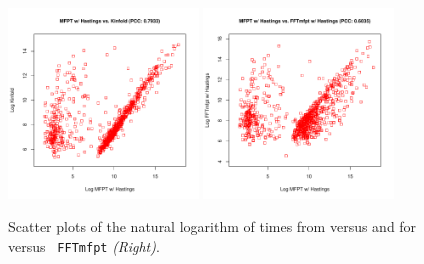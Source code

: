 \begin{figure}[!ht]
\centering
\includegraphics[width=0.45\textwidth]{Figures/Hermes/rnaMfptHastingsKinfold.pdf}
\quad
\includegraphics[width=0.45\textwidth]{Figures/Hermes/rnaMfptHastingsFftMfptHastings.pdf}
\caption{ Scatter plots of the natural logarithm of times from \rnamfpt
versus  and for \rnamfpt versus {\tt
FFTmfpt} {\em (Right)}. }
\label{fig:hermes:scatterplotRnaMfptHastingsVsKinfoldAndFftMfpt}
\end{figure}

